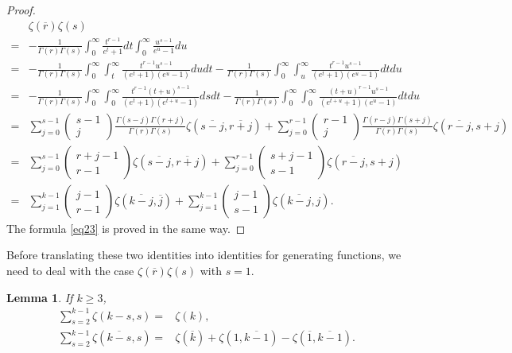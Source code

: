 \documentclass[reqno]{amsart}
\newtheorem{lemma}[theorem]{Lemma}
\theoremstyle{definition}
\theoremstyle{remark}
\numberwithin{equation}{section}
\begin{document}
\begin{proof}
\begin{align*}
&\zeta(\overline{r})\zeta(s)\\=&-\frac{1}{\Gamma(r) \Gamma(s)}\int_0^{\infty}\frac{t^{r-1}}{e^t+1}dt\int_0^{\infty}\frac{u^{s-1}}{e^u-1}du\\
=&-\frac{1}{\Gamma(r) \Gamma(s)}\int_0^{\infty}\int_t^{\infty}\frac{t^{r-1}u^{s-1}}{(e^t+1)(e^u-1)}dudt-\frac{1}{\Gamma(r) \Gamma(s)}\int_0^{\infty}\int_u^{\infty}\frac{t^{r-1}u^{s-1}}{(e^t+1)(e^u-1)}dtdu\\
=&-\frac{1}{\Gamma(r)\Gamma(s)}\int_0^{\infty}\int_0^{\infty}\frac{t^{r-1}(t+u)^{s-1}}{(e^t+1)(e^{t+u}-1)}dsdt-\frac{1}{\Gamma(r)\Gamma(s)}
\int_0^{\infty}\int_0^{\infty}\frac{(t+u)^{r-1}u^{s-1}}{(e^{t+u}+1)(e^u-1)}dtdu\\
=&\sum_{j=0}^{s-1}\begin{pmatrix}s-1\\j\end{pmatrix}\frac{\Gamma(s-j)\Gamma(r+j)}{\Gamma(r) \Gamma(s)}\zeta(\overline{s-j},\overline{r+j})+ \sum_{j=0}^{r-1}\begin{pmatrix}r-1\\j\end{pmatrix}\frac{\Gamma(r-j)\Gamma(s+j)}{\Gamma(r) \Gamma(s)}\zeta(\overline{r-j}, s+j)\\
=&\sum_{j=0}^{s-1}\begin{pmatrix}r+j-1\\r-1\end{pmatrix} \zeta(\overline{s-j},\overline{r+j})+ \sum_{j=0}^{r-1}\begin{pmatrix}s+j-1\\s-1\end{pmatrix} \zeta(\overline{r-j}, s+j)\\
=&\sum_{j=1}^{k-1} \begin{pmatrix}j-1\\r-1\end{pmatrix} \zeta(\overline{k-j}, \overline{j})+\sum_{j=1}^{k-1} \begin{pmatrix}j-1\\s-1\end{pmatrix} \zeta(\overline{k-j}, j).
\end{align*}
The  formula \eqref{eq23} is proved in the same way.
\end{proof}
Before translating these two identities into identities for generating functions, we need to deal with the case $\zeta(\overline{r})\zeta(s)$ with $s=1$.
\begin{lemma}If $k\geq 3$,
\begin{align}
\sum_{s=2}^{k-1}\zeta(k-s, s)=&\zeta(k),\label{eq24}\\
\sum_{s=2}^{k-1}\zeta(\overline{k-s}, s)=&\zeta(\overline{k})+\zeta(1, \overline{k-1})-\zeta(\overline{1}, \overline{k-1}).\label{eq25}
\end{align}
\end{lemma}
\end{document}
